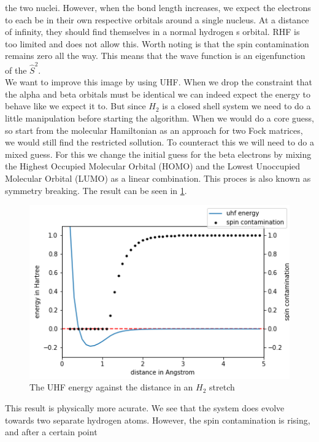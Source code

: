\documentclass[twoside,twocolumn,9pt]{article}
\begin{document}
the two nuclei. However, when the bond length increases, we expect the electrons to each be in their own respective orbitals around a single nucleus. At a distance of infinity, they
should find themselves in a normal hydrogen s orbital. RHF is too limited and does not allow this. Worth noting is that the spin contamination remains zero all the way. This means
that the wave function is an eigenfunction of the $\hat{S}^2$\cite{Scuseria2011}. \\
We want to improve this image by using UHF.  When we drop the constraint that the alpha and beta orbitals must be identical we can indeed expect the energy to behave like we expect
it to. But since $H_2$ is a closed shell system we need to do a little manipulation before starting the algorithm. When we would do a core guess, so start from the molecular
Hamiltonian as an approach for two Fock matrices, we would still find the restricted sollution. To counteract this we will need to do a mixed guess. For this we change the initial
guess for the beta electrons by mixing the Highest Occupied Molecular Orbital (HOMO) and the Lowest Unoccupied Molecular Orbital (LUMO) as a linear combination. This proces is also
known as symmetry breaking. The result can be seen in \ref{fig:uhfstretch}.
\begin{center}
  \begin{figure}[h]
    \includegraphics[width=\linewidth]{./../notes/figures/uhf.png}
    \caption{The UHF energy against the distance in an $H_2$ stretch}
    \label{fig:uhfstretch}
  \end{figure}
\end{center}
This result is physically more acurate. We see that the system does evolve towards two separate hydrogen atoms. However, the spin contamination is rising, and after a certain point
\end{document}
